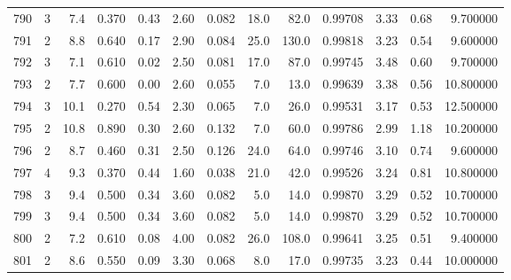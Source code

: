\begin{tabular}{lrrrrrrrrrrrr}
790  &        3 &            7.4 &             0.370 &         0.43 &            2.60 &      0.082 &                 18.0 &                  82.0 &  0.99708 &  3.33 &       0.68 &   9.700000 \\
791  &        2 &            8.8 &             0.640 &         0.17 &            2.90 &      0.084 &                 25.0 &                 130.0 &  0.99818 &  3.23 &       0.54 &   9.600000 \\
792  &        3 &            7.1 &             0.610 &         0.02 &            2.50 &      0.081 &                 17.0 &                  87.0 &  0.99745 &  3.48 &       0.60 &   9.700000 \\
793  &        2 &            7.7 &             0.600 &         0.00 &            2.60 &      0.055 &                  7.0 &                  13.0 &  0.99639 &  3.38 &       0.56 &  10.800000 \\
794  &        3 &           10.1 &             0.270 &         0.54 &            2.30 &      0.065 &                  7.0 &                  26.0 &  0.99531 &  3.17 &       0.53 &  12.500000 \\
795  &        2 &           10.8 &             0.890 &         0.30 &            2.60 &      0.132 &                  7.0 &                  60.0 &  0.99786 &  2.99 &       1.18 &  10.200000 \\
796  &        2 &            8.7 &             0.460 &         0.31 &            2.50 &      0.126 &                 24.0 &                  64.0 &  0.99746 &  3.10 &       0.74 &   9.600000 \\
797  &        4 &            9.3 &             0.370 &         0.44 &            1.60 &      0.038 &                 21.0 &                  42.0 &  0.99526 &  3.24 &       0.81 &  10.800000 \\
798  &        3 &            9.4 &             0.500 &         0.34 &            3.60 &      0.082 &                  5.0 &                  14.0 &  0.99870 &  3.29 &       0.52 &  10.700000 \\
799  &        3 &            9.4 &             0.500 &         0.34 &            3.60 &      0.082 &                  5.0 &                  14.0 &  0.99870 &  3.29 &       0.52 &  10.700000 \\
800  &        2 &            7.2 &             0.610 &         0.08 &            4.00 &      0.082 &                 26.0 &                 108.0 &  0.99641 &  3.25 &       0.51 &   9.400000 \\
801  &        2 &            8.6 &             0.550 &         0.09 &            3.30 &      0.068 &                  8.0 &                  17.0 &  0.99735 &  3.23 &       0.44 &  10.000000 \\

\end{tabular}
